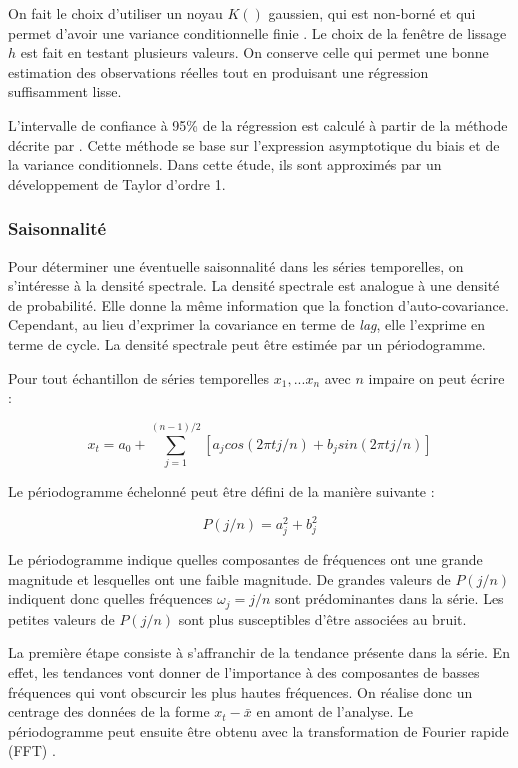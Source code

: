 \documentclass[12pt]{article}
\begin{document}
On fait le choix d'utiliser un noyau $K()$ gaussien, qui est non-borné et qui permet d'avoir une variance conditionnelle finie \citep{Simonoff1996}. Le choix de la fenêtre de lissage $h$ est fait en testant plusieurs valeurs. On conserve celle qui permet une bonne estimation des observations réelles tout en produisant une régression suffisamment lisse. 

L'intervalle de confiance à 95\% de la régression est calculé à partir de la méthode décrite par \citet{Fan1996}. Cette méthode se base sur l’expression asymptotique du biais et de la variance conditionnels. Dans cette étude, ils sont approximés par un développement de Taylor d’ordre 1. 

\subsubsection{Saisonnalité}

Pour déterminer une éventuelle saisonnalité dans les séries temporelles, on s’intéresse à la densité spectrale. La densité spectrale est analogue à une densité de probabilité. Elle donne la même information que la fonction d’auto-covariance. Cependant, au lieu d’exprimer la covariance en terme de \textit{lag}, elle l’exprime en terme de cycle. La densité spectrale peut être estimée par un périodogramme. 

Pour tout échantillon de séries temporelles $x_1, ...x_n$ avec $n$ impaire on peut écrire : 

\[x_t=a_0 + \sum_{j=1}^{(n-1)/2}[a_jcos(2\pi t j/n)+b_jsin(2\pi t j/n)]\]

Le périodogramme échelonné peut être défini de la manière suivante : 

\[P(j/n)=a^2_j+b^2_j\]

Le périodogramme indique quelles composantes de fréquences ont une grande magnitude et lesquelles ont une faible magnitude. De grandes valeurs de $P(j/n)$ indiquent donc quelles fréquences $\omega_j=j/n$ sont prédominantes dans la série. Les petites valeurs de $P(j/n)$ sont plus susceptibles d'être associées au bruit. 

La première étape consiste à s'affranchir de la tendance présente dans la série. En effet, les tendances vont donner de l'importance à des composantes de basses fréquences qui vont obscurcir les plus hautes fréquences. On réalise donc un centrage des données de la forme $x_t-\bar{x}$ en amont de l’analyse. Le périodogramme peut ensuite être obtenu avec la transformation de Fourier rapide (FFT) \citep{Shumway2016}. 
\end{document}
